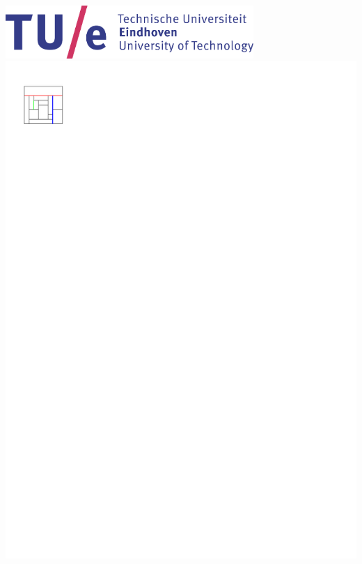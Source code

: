 \documentclass[a4paper]{article}
\begin{document}
\includegraphics[height=2cm]{tue-logo-high}
\clearpage%
\setcounter{page}{0}
\includegraphics[scale=1]{rectangularDuals/img/segmentdefs}
\clearpage%
\end{document}
